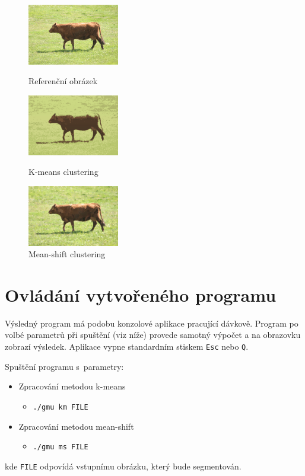 \documentclass[11pt,a4paper]{article}
\begin{document}
\begin{figure}[ht]
        \begin{center}
            \includegraphics[width=4cm,keepaspectratio]{images/img.pdf}
        \end{center}
        \caption{Referenční obrázek}
    \endminipage
    \hfill
        \begin{center}
            \includegraphics[width=4cm,keepaspectratio]{images/km.pdf}
        \end{center}
        \caption{K-means clustering}
    \endminipage
    \hfill
        \begin{center}
            \includegraphics[width=4cm,keepaspectratio]{images/ms.pdf}
        \end{center}
        \caption{Mean-shift clustering}
    \endminipage
\end{figure}


\section{Ovládání vytvořeného programu}
Výsledný program má podobu konzolové aplikace pracující dávkově. Program po volbé parametrů při spuštění (viz níže) provede samotný výpočet a na obrazovku zobrazí výsledek. Aplikace vypne standardním stiskem \texttt{Esc} nebo \texttt{Q}.

Spuštění programu s~parametry:
\begin{itemize}
  \item Zpracování metodou k-means 
    \begin{itemize}
      \item[] \texttt{./gmu km FILE}
    \end{itemize}
  \item Zpracování metodou mean-shift
    \begin{itemize}
      \item[] \texttt{./gmu ms FILE}
    \end{itemize}
\end{itemize}
kde \texttt{FILE} odpovídá vstupnímu obrázku, který bude segmentován.
\end{document}
